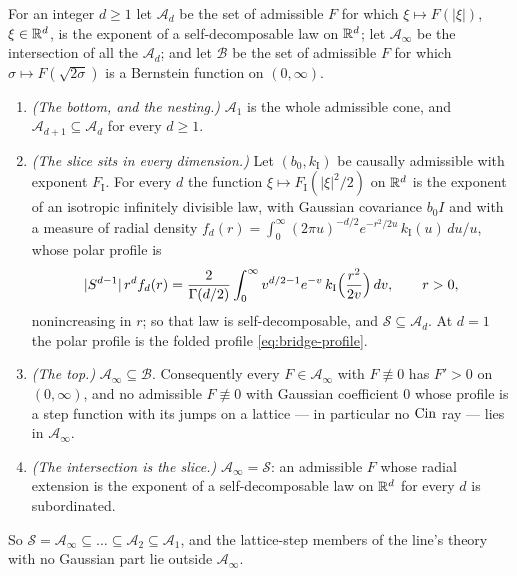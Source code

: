 \begin{proposition}\label{prop:dimension-filtration}
For an integer $d \ge 1$ let $\mathcal{A}_d$ be the set of admissible $F$ for which
$\xi \mapsto F(|\xi|)$, $\xi \in \mathbb{R}^d$, is the exponent of a self-decomposable law on $\mathbb{R}^d$;
let $\mathcal{A}_\infty$ be the intersection of all the $\mathcal{A}_d$; and let $\mathcal{B}$ be the set of
admissible $F$ for which $\sigma \mapsto F(\sqrt{2\sigma})$ is a Bernstein function on
$(0,\infty)$.
\begin{enumerate}
\item \emph{(The bottom, and the nesting.)} $\mathcal{A}_1$ is the whole admissible cone, and
$\mathcal{A}_{d+1} \subseteq \mathcal{A}_d$ for every $d \ge 1$.
\item \emph{(The slice sits in every dimension.)} Let $(b_0,k_{\mathrm I})$ be causally
admissible with exponent $F_{\mathrm I}$. For every $d$ the function
$\xi \mapsto F_{\mathrm I}(|\xi|^2/2)$ on $\mathbb{R}^d$ is the exponent of an isotropic infinitely
divisible law, with Gaussian covariance $b_0 I$ and with a \Levy{} measure of radial density
$f_d(r) = \int_0^\infty (2\pi u)^{-d/2}e^{-r^2/2u}\,k_{\mathrm I}(u)\,du/u$, whose polar profile
is
\begin{equation}\label{eq:radial-profile}
  |S^{d-1}|\,r^d f_d(r)
   = \frac{2}{\Gamma(d/2)}\int_0^\infty v^{d/2-1}e^{-v}\,
     k_{\mathrm I}\Bigl(\frac{r^2}{2v}\Bigr)\,dv, \qquad r > 0 ,
\end{equation}
nonincreasing in $r$; so that law is self-decomposable, and
$\mathcal{S} \subseteq \mathcal{A}_d$. At $d = 1$ the polar profile is the folded profile
\ref{eq:bridge-profile}.
\item \emph{(The top.)} $\mathcal{A}_\infty \subseteq \mathcal{B}$. Consequently every
$F \in \mathcal{A}_\infty$ with $F \not\equiv 0$ has $F' > 0$ on $(0,\infty)$, and no admissible
$F \not\equiv 0$ with Gaussian coefficient $0$ whose profile is a step function with its jumps on a lattice --- in particular
no $\operatorname{Cin}$ ray --- lies in $\mathcal{A}_\infty$.
\item \emph{(The intersection is the slice.)} $\mathcal{A}_\infty = \mathcal{S}$: an admissible
$F$ whose radial extension is the exponent of a self-decomposable law on $\mathbb{R}^d$ for every $d$
is subordinated.
\end{enumerate}
So $\mathcal{S} = \mathcal{A}_\infty \subseteq \dots \subseteq \mathcal{A}_2 \subseteq
\mathcal{A}_1$, and the lattice-step members of the line's theory with no Gaussian part lie outside
$\mathcal{A}_\infty$.
\end{proposition}


